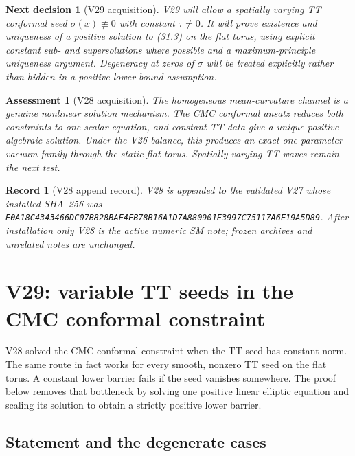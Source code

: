 \documentclass[11pt]{article}
\newtheorem{decision}[theorem]{Next decision}
\newtheorem{assessment}[theorem]{Assessment}
\newtheorem{record}[theorem]{Record}
\theoremstyle{remark}
\begin{document}
\begin{decision}[V29 acquisition]
\label{dec:v19v28-next}
V29 will allow a spatially varying TT conformal seed
\(\sigma(x)\not\equiv0\) with constant \(\tau\neq0\).  It will prove
existence and uniqueness of a positive solution to (31.3) on the flat
torus, using explicit constant sub- and supersolutions where possible and
a maximum-principle uniqueness argument.  Degeneracy at zeros of
\(\sigma\) will be treated explicitly rather than hidden in a positive
lower-bound assumption.
\end{decision}

\begin{assessment}[V28 acquisition]
\label{ass:v19v28}
The homogeneous mean-curvature channel is a genuine nonlinear solution
mechanism.  The CMC conformal ansatz reduces both constraints to one
scalar equation, and constant TT data give a unique positive algebraic
solution.  Under the V26 balance, this produces an exact one-parameter
vacuum family through the static flat torus.  Spatially varying TT waves
remain the next test.
\end{assessment}

\begin{record}[V28 append record]
\label{rec:v19v28}
V28 is appended to the validated V27 whose installed SHA--256 was
\texttt{E0A18C4343466DC07B828BAE4FB78B16A1D7A880901E3997C75117A6E19A5D89}.
After installation only V28 is the active numeric SM note; frozen
archives and unrelated notes are unchanged.
\end{record}



\section{V29: variable TT seeds in the CMC conformal constraint}
\label{sec:v19v29}

V28 solved the CMC conformal constraint when the TT seed has constant
norm.  The same route in fact works for every smooth, nonzero TT seed on
the flat torus.  A constant lower barrier fails if the seed vanishes
somewhere.  The proof below removes that bottleneck by solving one
positive linear elliptic equation and scaling its solution to obtain a
strictly positive lower barrier.

\subsection{Statement and the degenerate cases}
\end{document}
